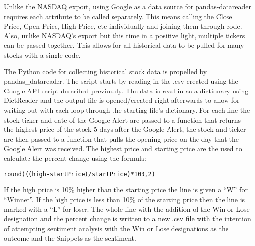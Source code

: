 \documentclass[sigconf]{acmart}
\begin{document}
Unlike the NASDAQ export, using Google as a data source for pandas-datareader requires each attribute to be called separately. This means calling the Close Price, Open Price, High Price, etc individually and joining them through code. Also, unlike NASDAQ's export but this time in a positive light, multiple tickers can be passed together. This allows for all historical data to be pulled for many stocks with a single code. 

The Python code for collecting historical stock data is propelled by pandas\_datareader. The script starts by reading in the .csv created using the Google API script described previously. The data is read in as a dictionary using DictReader and the output file is opened/created right afterwards to allow for writing out with each loop through the starting file's dictionary. For each line the stock ticker and date of the Google Alert are passed to a function that returns the highest price of the stock 5 days after the Google Alert, the stock and ticker are then passed to a function that pulls the opening price on the day that the Google Alert was received. The highest price and starting price are the used to calculate the percent change using the formula: 
\begin{lstlisting}
round(((high-startPrice)/startPrice)*100,2)
\end{lstlisting}
If the high price is 10\% higher than the starting price the line is given a ``W'' for ``Winner''. If the high price is less than 10\% of the starting price then the line is marked with a ``L'' for loser. The whole line with the addition of the Win or Lose  designation and the percent change is written to a new .csv file with the intention of attempting sentiment analysis with the Win or Lose designations as the outcome and the Snippets as the sentiment. 
\end{document}
